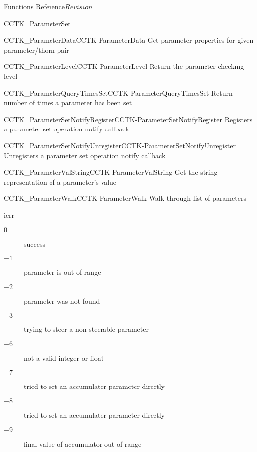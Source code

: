 \begin{cactuspart}{ Functions Reference}{}{$Revision$}
\begin{FunctionDescription}{CCTK\_ParameterSet}
\begin{SeeAlsoSection}
\begin{SeeAlso2}{CCTK\_ParameterData}{CCTK-ParameterData}
  Get parameter properties for given parameter/thorn pair
\end{SeeAlso2}
\begin{SeeAlso2}{CCTK\_ParameterLevel}{CCTK-ParameterLevel}
  Return the parameter checking level
\end{SeeAlso2}
\begin{SeeAlso2}{CCTK\_ParameterQueryTimesSet}{CCTK-ParameterQueryTimesSet}
  Return number of times a parameter has been set
\end{SeeAlso2}
\begin{SeeAlso2}{CCTK\_ParameterSetNotifyRegister}{CCTK-ParameterSetNotifyRegister}
  Registers a parameter set operation notify callback
\end{SeeAlso2}
\begin{SeeAlso2}{CCTK\_ParameterSetNotifyUnregister}{CCTK-ParameterSetNotifyUnregister}
  Unregisters a parameter set operation notify callback
\end{SeeAlso2}
\begin{SeeAlso2}{CCTK\_ParameterValString}{CCTK-ParameterValString}
  Get the string representation of a parameter's value
\end{SeeAlso2}
\begin{SeeAlso2}{CCTK\_ParameterWalk}{CCTK-ParameterWalk}
  Walk through list of parameters
\end{SeeAlso2}
\end{SeeAlsoSection}

\begin{ErrorSection}
\begin{Error}{ierr}
\begin{description}
\item[$0$] success
\item[$-1$] parameter is out of range
\item[$-2$] parameter was not found
\item[$-3$] trying to steer a non-steerable parameter
\item[$-6$] not a valid integer or float
\item[$-7$] tried to set an accumulator parameter directly
\item[$-8$] tried to set an accumulator parameter directly
\item[$-9$] final value of accumulator out of range
\end{description}
\end{Error}
\end{ErrorSection}
\end{FunctionDescription}



\end{cactuspart}
